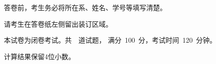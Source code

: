 \documentclass[12pt,letter]{ustcexam}
\begin{document}
\mifengxian

\Makedefen

\vspace{1em}
\begin{notice}
\item 答卷前，考生务必将所在系、姓名、学号等填写清楚。
\item 请考生在答卷纸左侧留出装订区域。
\item 本试卷为闭卷考试。共~\numquestions{}~道试题，
      满分~100~分，考试时间~120~分钟。
\item 计算结果保留4位小数。
\end{notice}
\end{document}
